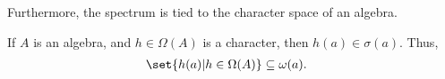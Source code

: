 Furthermore, the spectrum is tied to the character space of an algebra.
\begin{corollary}
  If $A$ is an algebra, and $h\in \Omega\left( A \right)$ is a character, then $h(a)\in \sigma\left( a \right)$. Thus,
  \begin{align*}
    \set{h(a) | h\in \Omega(A)} &\subseteq \omega(a).
  \end{align*}
\end{corollary}
